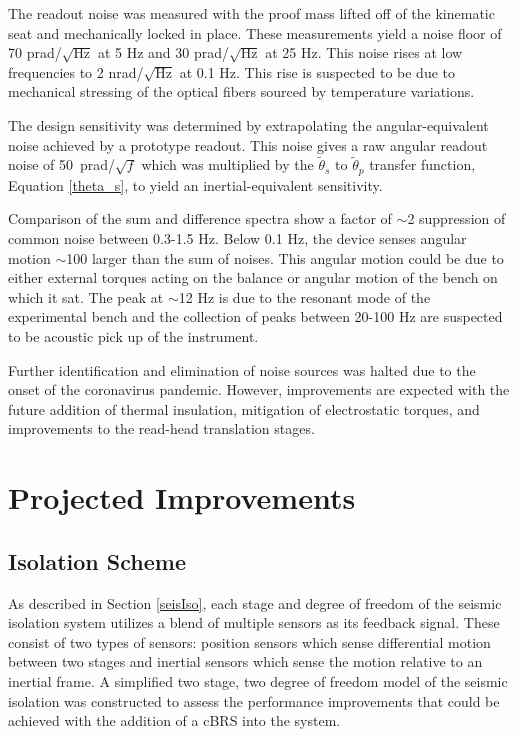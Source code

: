 \documentclass [12pt, proquest]{uwthesis}[2019]
\begin{document}
The readout noise was measured with the proof mass lifted off of the kinematic seat and mechanically locked in place. These measurements yield a noise floor of 70 prad/$\sqrt{\text{Hz}}$ at 5 Hz and 30 prad/$\sqrt{\text{Hz}}$ at 25 Hz. This noise rises at low frequencies to 2 nrad/$\sqrt{\text{Hz}}$ at 0.1 Hz. This rise is suspected to be due to mechanical stressing of the optical fibers sourced by temperature variations.

 The design sensitivity was determined by extrapolating the angular-equivalent noise achieved by a prototype readout. This noise gives a raw angular readout noise of 50~prad/$\sqrt{f}$ which was multiplied by the $\tilde{\theta}_{s}$ to $\tilde{\theta}_{p}$ transfer function, Equation \ref{theta_s}, to yield an inertial-equivalent sensitivity.
 
 Comparison of the sum and difference spectra show a factor of $\sim$2 suppression of common noise between 0.3-1.5 Hz. Below 0.1 Hz, the device senses angular motion $\sim$100 larger than the sum of noises. This angular motion could be due to either external torques acting on the balance or angular motion of the bench on which it sat. The peak at $\sim$12 Hz is due to the resonant mode of the experimental bench and the collection of peaks between 20-100 Hz are suspected to be acoustic pick up of the instrument. 
 
 Further identification and elimination of noise sources was halted due to the onset of the coronavirus pandemic. However, improvements are expected with the future addition of thermal insulation, mitigation of electrostatic torques, and improvements to the read-head translation stages.


\section{Projected Improvements}
\subsection{Isolation Scheme} \label{IsoScheme}

As described in Section \ref{seisIso}, each stage and degree of freedom of the seismic isolation system utilizes a blend of multiple sensors as its feedback signal. These consist of two types of sensors: position sensors which sense differential motion between two stages and inertial sensors which sense the motion relative to an inertial frame. A simplified two stage, two degree of freedom model of the seismic isolation was constructed to assess the performance improvements that could be achieved with the addition of a cBRS into the system. 
\end{document}

